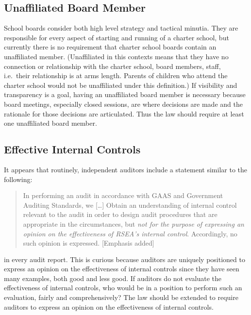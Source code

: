 \subsection{Unaffiliated Board Member}\indent%
\label{sec:unaff-board-memb}\indent%

School boards consider both high level strategy and tactical minutia. They are responsible for every aspect of starting and running of a charter school, but currently there is no requirement that charter school boards contain an unaffiliated member. (Unaffiliated in this contexts means that they have no connection or relationship with the charter school, board members, staff, i.e.\ their relationship is at arms length. Parents of children who attend the charter school would not be unaffiliated under this definition.) If visibility and transparency is a goal, having an unaffiliated board member is necessary because board meetings, especially closed sessions, are where decisions are made and the rationale for those decisions are articulated. Thus the law should require at least one unaffiliated board member.

\subsection{Effective Internal Controls}%
\label{sec:effect-intern-contr}\indent%

It appears that routinely, independent auditors include a statement similar to the following:
\begin{quotation}\noindent
  In performing an audit in accordance with GAAS and Government Auditing Standards, we [\ldots]
  Obtain an understanding of internal control relevant to the audit in order to design audit procedures that are appropriate in the circumstances, but \textit{not for the purpose of expressing an opinion on the effectiveness of RSEA’s internal control}. Accordingly, no such opinion is expressed. [Emphasis added]
\end{quotation}
in every audit report. This is curious because auditors are uniquely positioned to express an opinion on the effectiveness of internal controls since they have seen many examples, both good and less good. If auditors do not evaluate the effectiveness of internal controls, who would be in a position to perform such an evaluation, fairly and comprehensively? The law should be extended to require auditors to express an opinion on the effectiveness of internal controls.

